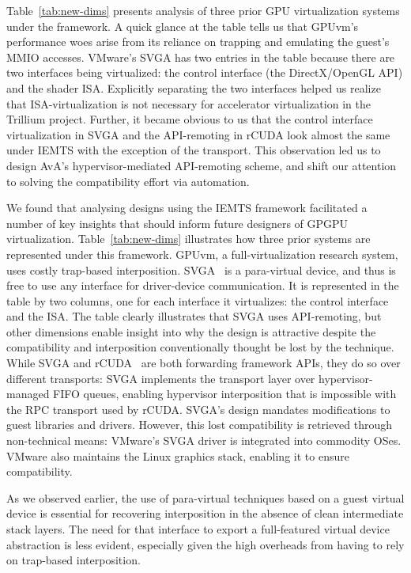 Table~\ref{tab:new-dims} presents analysis of three prior GPU virtualization
systems under the \iemts framework. A quick glance at the table
tells us that GPUvm's~\cite{suzuki2014gpuvm} performance woes arise from its
reliance on trapping and emulating the guest's MMIO accesses. VMware's SVGA
has two entries in the table because there are two interfaces being
virtualized: the control interface (the DirectX/OpenGL API) and the shader ISA.
Explicitly separating the two interfaces helped us realize that
ISA-virtualization is not necessary for accelerator virtualization in the
Trillium project. Further, it became obvious to us that the control interface
virtualization in SVGA and the API-remoting in rCUDA look almost the same
under IEMTS with the exception of the transport. This observation led us
to design AvA's hypervisor-mediated API-remoting scheme, and shift our
attention to solving the compatibility effort via automation.



We found that analysing designs using the IEMTS framework facilitated a number
of key insights that should inform future designers of GPGPU virtualization.
Table~\ref{tab:new-dims} illustrates how three prior systems are represented under this framework.
GPUvm\cite{GPUvm}, a full-virtual\-ization research system,
uses costly trap-based interposition.
SVGA~\cite{dowty2009gpu} is a para-virtual device, and thus is free to use any interface for
driver-device communication. It is represented  in the table by two columns, one for
each interface it virtualizes: the control interface and the ISA.
The table clearly illustrates that SVGA uses API-remoting, but other dimensions
enable insight into why the design is attractive despite the compatibility and
interposition conventionally thought be lost by the technique.
While SVGA and rCUDA~\cite{vmCUDA, rCUDA}
are both forwarding framework APIs,
they do so over different transports:
SVGA implements the transport layer over hypervisor-managed FIFO queues,
enabling hypervisor interposition that is impossible with the RPC transport used by rCUDA.
SVGA's design mandates modifications to guest libraries and drivers.
However, this lost compatibility is retrieved through non-technical means:
VMware's SVGA driver is integrated into commodity OSes.
VMware also maintains the Linux graphics stack, enabling it to ensure compatibility.

As we observed earlier, the use of para-virtual techniques based on a guest virtual device
is essential for recovering interposition in the absence of clean intermediate stack layers.
The need for that interface to export a full-featured virtual device abstraction
is less evident, especially given the high overheads from having to rely on trap-based
interposition.